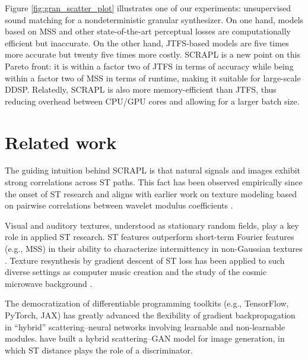\documentclass{article} %
\theoremstyle{plain}
\theoremstyle{definition}
\theoremstyle{remark}
\begin{document}
Figure \ref{fig:gran_scatter_plot} illustrates one of our experiments: unsupervised sound matching for a nondeterministic granular synthesizer. 
On one hand, models based on MSS and other state-of-the-art perceptual losses are computationally efficient but inaccurate.
On the other hand, JTFS-based models are five times more accurate but twenty five times more costly.
SCRAPL is a new point on this Pareto front: it is within a factor two of JTFS in terms of accuracy while being within a factor two of MSS in terms of runtime, making it suitable for large-scale DDSP.
Relatedly, SCRAPL is also more memory-efficient than JTFS, thus reducing overhead between CPU/GPU cores and allowing for a larger batch size.


\section{Related work}
\label{sec:related_work}

The guiding intuition behind SCRAPL is that natural signals and images exhibit strong correlations across ST paths.
This fact has been observed empirically since the onset of ST research \citep{bruna2013invariant,anden2011multiscale} and aligns with earlier work on texture modeling based on pairwise correlations between wavelet modulus coefficients \citep{portilla2000parametric}.

Visual and auditory textures, understood as stationary random fields,  play a key role in applied ST research.
ST features outperform short-term Fourier features (e.g., MSS) in their ability to characterize intermittency in non-Gaussian textures \citep{muzy2015intermittent}.
Texture resynthesis by gradient descent of ST loss has been applied to such diverse settings as computer music creation \citep{lostanlen2019fourier} and the study of the cosmic microwave background \citep{delouis2022non}.

The democratization of differentiable programming toolkits (e.g., TensorFlow, PyTorch, JAX) has greatly advanced the flexibility of gradient backpropagation in 
``hybrid'' scattering--neural networks involving learnable and non-learnable modules.
\cite{angles2018generative} have built a hybrid scattering--GAN model for image generation, in which ST distance plays the role of a discriminator.
\end{document}

